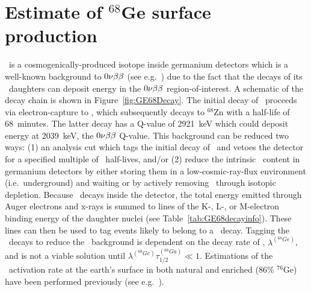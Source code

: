 	\section{Estimate of $^{68}$Ge surface production}       
	
       \gersixeight~is a cosmogenically-produced isotope inside germanium detectors which is a well-known background to $0 \nu \beta \beta$ (see e.g.~\cite{Ceb06aa}) due to the fact that the decays of its \galsixeight~daughters can deposit energy in the $0 \nu \beta \beta$ region-of-interest.  A schematic of the decay chain is shown in Figure~\ref{fig:GE68Decay}.  The initial decay of \gersixeight~proceeds via electron-capture to \galsixeight, which subsequently decays to $^{68}$Zn with a half-life of 68~minutes.  The latter decay has a Q-value of 2921~keV which could deposit energy at 2039~keV, the $0 \nu \beta \beta$ Q-value.  This background can be reduced two ways: (1) an analysis cut which tags the initial decay of \gersixeight~and vetoes the detector for a specified multiple of \galsixeight~half-lives, and/or (2) reduce the intrinsic \gersixeight~content in germanium detectors by either storing them in a low-cosmic-ray-flux environment (i.e.~underground) and waiting or by actively removing \gersixeight~through isotopic depletion.  Because \gersixeight~decays inside the detector, the total energy emitted through Auger electrons and x-rays is summed to lines of the K-, L-, or M-electron binding energy of the daughter nuclei (see Table~\ref{tab:GE68decayinfo}).  These lines can then be used to tag events likely to belong to a \gersixeight~decay.  Tagging the \gersixeight~decays to reduce the \galsixeight~background is dependent on the decay rate of \gersixeight, $\lambda^{(^{68}Ge)}$, and is not a viable solution until $\lambda^{(^{68}Ge)} \tau_{1/2}^{(^{68}Ga)} \ll 1$.   Estimations of the \gersixeight~activation rate at the earth's surface in both natural and enriched (86\% $^{76}$Ge) have been performed previously (see e.g.~\cite{Avi92,Elliott:2009cw}).  

